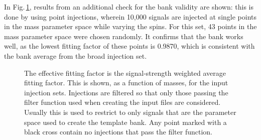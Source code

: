 \documentclass[binding=0.6cm, LaM]{sapthesis}
\begin{document}
	In Fig.\,\ref{fig:pointinj}, results from an additional check for the bank validity are shown: 
	this is done by using point injections, wherein 10,000 signals are injected at single points in the mass parameter space while varying the spins. 
	For this set, 43 points in the mass parameter space were chosen randomly. 
	It confirms that the bank works well, as the lowest fitting factor of these points is 0.9870, 
	which is consistent with the bank average from the broad injection set. 
                \begin{figure}[!t]
                        \noindent
                        \label{pointinj}
                        \centering
                        \caption{The effective fitting factor is the signal-strength weighted average fitting factor. This is shown, as a function of masses, for the input injection sets. Injections are filtered so that only those passing the filter function used when creating the input files are considered. Usually this is used to restrict to only signals that are the parameter space used to create the template bank. Any point marked with a black cross contain no injections that pass the filter function.}
                        \label{fig:pointinj}
                \end{figure}
\end{document}
